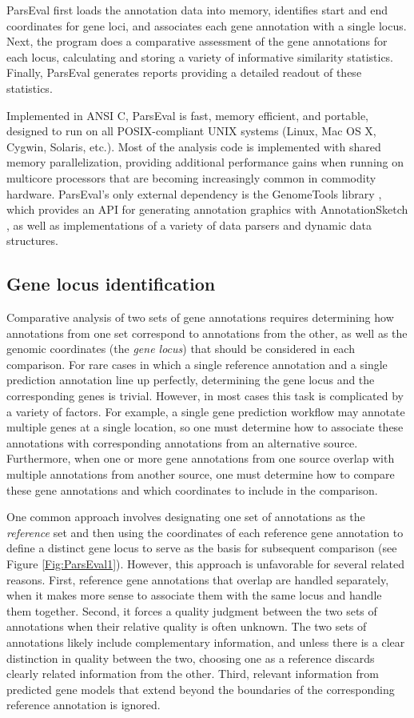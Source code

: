 ParsEval first loads the annotation data into memory, identifies start and end coordinates for gene loci, and associates each gene annotation with a single locus.
Next, the program does a comparative assessment of the gene annotations for each locus, calculating and storing a variety of informative similarity statistics.
Finally, ParsEval generates reports providing a detailed readout of these statistics.

Implemented in ANSI C, ParsEval is fast, memory efficient, and portable, designed to run on all POSIX-compliant UNIX systems (Linux, Mac OS X, Cygwin, Solaris, etc.).
Most of the analysis code is implemented with shared memory parallelization, providing additional performance gains when running on multicore processors that are becoming increasingly common in commodity hardware.
ParsEval's only external dependency is the GenomeTools library \citep{GenomeToolsWebsite}, which provides an API for generating annotation graphics with AnnotationSketch \citep{Steinbiss}, as well as implementations of a variety of data parsers and dynamic data structures.

\subsection{Gene locus identification}
Comparative analysis of two sets of gene annotations requires determining how annotations from one set correspond to annotations from the other, as well as the genomic coordinates (the \emph{gene locus}) that should be considered in each comparison.
For rare cases in which a single reference annotation and a single prediction annotation line up perfectly, determining the gene locus and the corresponding genes is trivial.
However, in most cases this task is complicated by a variety of factors.
For example, a single gene prediction workflow may annotate multiple genes at a single location, so one must determine how to associate these annotations with corresponding annotations from an alternative source.
Furthermore, when one or more gene annotations from one source overlap with multiple annotations from another source, one must determine how to compare these gene annotations and which coordinates to include in the comparison.

One common approach involves designating one set of annotations as the \emph{reference} set and then using the coordinates of each reference gene annotation to define a distinct gene locus to serve as the basis for subsequent comparison (see Figure \ref{Fig:ParsEval1}).
However, this approach is unfavorable for several related reasons.
First, reference gene annotations that overlap are handled separately, when it makes more sense to associate them with the same locus and handle them together.
Second, it forces a quality judgment between the two sets of annotations when their relative quality is often unknown.
The two sets of annotations likely include complementary information, and unless there is a clear distinction in quality between the two, choosing one as a reference discards clearly related information from the other.
Third, relevant information from predicted gene models that extend beyond the boundaries of the corresponding reference annotation is ignored.

